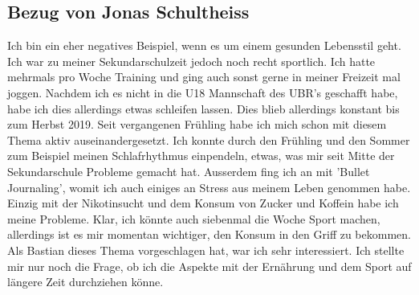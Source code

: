 \subsection{Bezug von Jonas Schultheiss}
Ich bin ein eher negatives Beispiel, wenn es um einem gesunden Lebensstil geht. Ich war zu meiner Sekundarschulzeit jedoch noch recht sportlich. Ich hatte mehrmals pro Woche Training und ging auch sonst gerne in meiner Freizeit mal joggen. Nachdem ich es nicht in die U18 Mannschaft des UBR's geschafft habe, habe ich dies allerdings etwas schleifen lassen.
\newline
Dies blieb allerdings konstant bis zum Herbst 2019. Seit vergangenen Frühling habe ich mich schon mit diesem Thema aktiv auseinandergesetzt. Ich konnte durch den Frühling und den Sommer zum Beispiel meinen Schlafrhythmus einpendeln, etwas, was mir seit Mitte der Sekundarschule Probleme gemacht hat. Ausserdem fing ich an mit 'Bullet Journaling', womit ich auch einiges an Stress aus meinem Leben genommen habe. Einzig mit der Nikotinsucht und dem Konsum von Zucker und Koffein habe ich meine Probleme. Klar, ich könnte auch siebenmal die Woche Sport machen, allerdings ist es mir momentan wichtiger, den Konsum in den Griff zu bekommen.
\newline
\newline
Als Bastian dieses Thema vorgeschlagen hat, war ich sehr interessiert. Ich stellte mir nur noch die Frage, ob ich die Aspekte mit der Ernährung und dem Sport auf längere Zeit durchziehen könne.